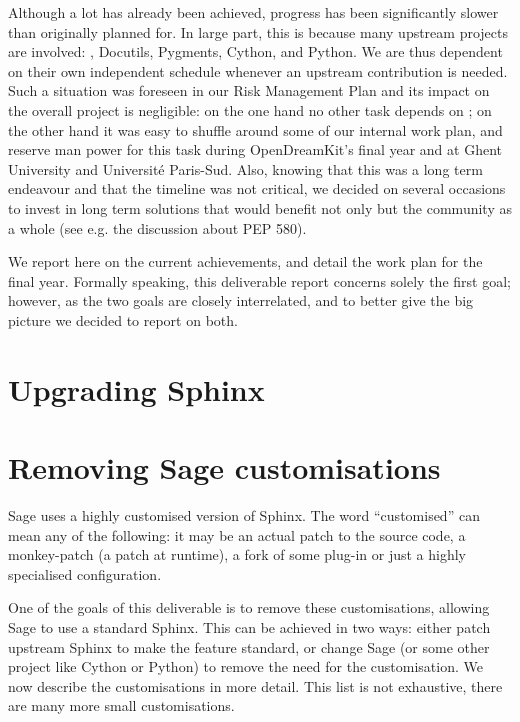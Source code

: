 \documentclass{deliverablereport}
\begin{document}
Although a lot has already been achieved, progress has been
significantly slower than originally planned for. In large part, this
is because many upstream projects are involved: \Sphinx, Docutils,
Pygments, Cython, and Python. We are thus dependent on their own
independent schedule whenever an upstream contribution is needed. Such
a situation was foreseen in our Risk Management Plan and its impact on
the overall project is negligible: on the one hand no other task
depends on ; on the other hand it was easy to
shuffle around some of our internal work plan, and reserve man power
for this task during OpenDreamKit's final year and at Ghent University
and Université Paris-Sud. Also, knowing that this was a long term
endeavour and that the timeline was not critical, we decided on
several occasions to invest in long term solutions that would benefit
not only \Sage but the community as a whole (see e.g. the discussion
about PEP 580).

We report here on the current achievements, and detail the work plan
for the final year. Formally speaking, this deliverable report
concerns solely the first goal; however, as the two goals are closely
interrelated, and to better give the big picture we decided to report
on both.


\section{Upgrading Sphinx}


\section{Removing Sage customisations}

Sage uses a highly customised version of Sphinx.
The word ``customised'' can mean any of the following:
it may be an actual patch to the source code,
a monkey-patch (a patch at runtime),
a fork of some plug-in or just a highly specialised configuration.

One of the goals of this deliverable is to remove these
customisations, allowing Sage to use a standard Sphinx.
This can be achieved in two ways:
either patch upstream Sphinx to make the feature standard,
or change Sage (or some other project like Cython or Python)
to remove the need for the customisation.
We now describe the customisations in more detail.
This list is not exhaustive, there are many more small
customisations.
\end{document}
